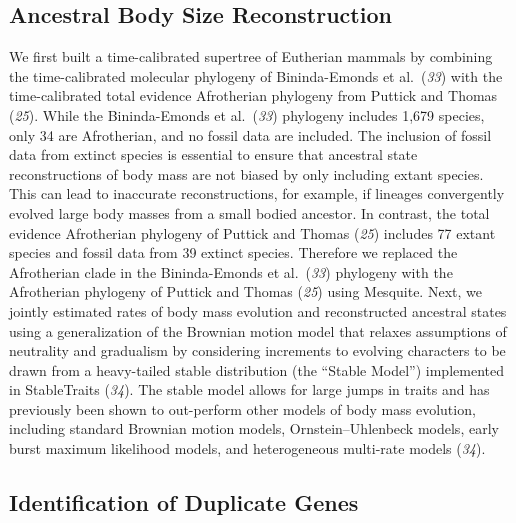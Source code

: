 \documentclass[]{elsarticle} %
\begin{document}
\hypertarget{ancestral-body-size-reconstruction}{%
\subsection{Ancestral Body Size Reconstruction}\label{ancestral-body-size-reconstruction}}

We first built a time-calibrated supertree of Eutherian mammals by combining the time-calibrated molecular phylogeny of Bininda-Emonds et al.~(\emph{33}) with the time-calibrated total evidence Afrotherian phylogeny from Puttick and Thomas (\emph{25}). While the Bininda-Emonds et al.~(\emph{33}) phylogeny includes 1,679 species, only 34 are Afrotherian, and no fossil data are included. The inclusion of fossil data from extinct species is essential to ensure that ancestral state reconstructions of body mass are not biased by only including extant species. This can lead to inaccurate reconstructions, for example, if lineages convergently evolved large body masses from a small bodied ancestor. In contrast, the total evidence Afrotherian phylogeny of Puttick and Thomas (\emph{25}) includes 77 extant species and fossil data from 39 extinct species. Therefore we replaced the Afrotherian clade in the Bininda-Emonds et al.~(\emph{33}) phylogeny with the Afrotherian phylogeny of Puttick and Thomas (\emph{25}) using Mesquite. Next, we jointly estimated rates of body mass evolution and reconstructed ancestral states using a generalization of the Brownian motion model that relaxes assumptions of neutrality and gradualism by considering increments to evolving characters to be drawn from a heavy-tailed stable distribution (the ``Stable Model'') implemented in StableTraits (\emph{34}). The stable model allows for large jumps in traits and has previously been shown to out-perform other models of body mass evolution, including standard Brownian motion models, Ornstein--Uhlenbeck models, early burst maximum likelihood models, and heterogeneous multi-rate models (\emph{34}).

\hypertarget{identification-of-duplicate-genes}{%
\subsection{Identification of Duplicate Genes}\label{identification-of-duplicate-genes}}
\end{document}
